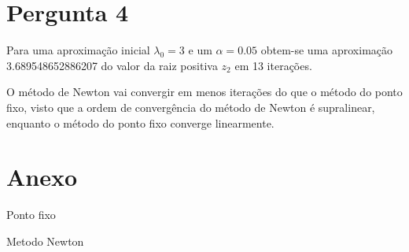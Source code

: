 \documentclass[a4paper, 18pt]{article}
\begin{document}
\section{Pergunta 4}
	\par Para uma aproximação inicial $\lambda _0 = 3$ e um $\alpha = 0.05$ obtem-se uma aproximação 3.689548652886207 do valor da raiz positiva $z_2$ em 13 iterações.
	
	O método de Newton vai convergir em menos iterações do que o método do ponto fixo, visto que a ordem de convergência do método de Newton é supralinear, enquanto o método do ponto fixo converge linearmente.


\section{Anexo}

\par{Ponto fixo}
	

\par{Metodo Newton}
	
\end{document}
